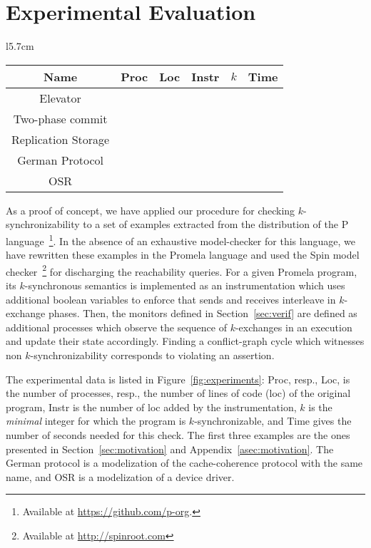 \section{Experimental Evaluation}

\begin{wrapfigure}{l}{5.7cm}
\vspace{-8mm}
{\scriptsize
\begin{tabular}{|c|c|c|c|c|c|}
\hline
Name & Proc & Loc & Instr & $k$ & Time \\
\hline
Elevator&  \\
\hline
Two-phase commit &  \\
\hline
Replication Storage& \\
\hline
German Protocol &  \\
\hline
OSR &  \\
\hline
\end{tabular}
}
\caption{Experimental results.}
\label{fig:experiments}
\vspace{-7mm}
\end{wrapfigure}
As a proof of concept, we have applied our procedure for checking $k$-synchronizability to a set of examples extracted from the distribution of the P language~\footnote{Available at \url{https://github.com/p-org}.}. In the absence of an exhaustive model-checker for this language, we have rewritten these examples in the Promela language and used the Spin model checker~\footnote{Available at \url{http://spinroot.com}} for discharging the reachability queries. For a given Promela program, its $k$-synchronous semantics is implemented as an instrumentation which uses additional boolean variables to enforce that sends and receives interleave in $k$-exchange phases. Then, the monitors defined in Section~\ref{sec:verif} are defined as additional processes which observe the sequence of $k$-exchanges in an execution and update their state accordingly. Finding a conflict-graph cycle which witnesses non $k$-synchronizability corresponds to violating an assertion. 

The experimental data is listed in Figure~\ref{fig:experiments}: Proc, resp., Loc, is the number of processes, resp., the number of lines of code (loc) of the original program, Instr is the number of loc added by the instrumentation, $k$ is the \emph{minimal} integer for which the program is $k$-synchronizable, and Time gives the number of seconds needed for this check. The first three examples are the ones presented in Section~\ref{sec:motivation} and Appendix~\ref{asec:motivation}. The German protocol is a modelization of the cache-coherence protocol with the same name, and OSR is a modelization of a device driver.
